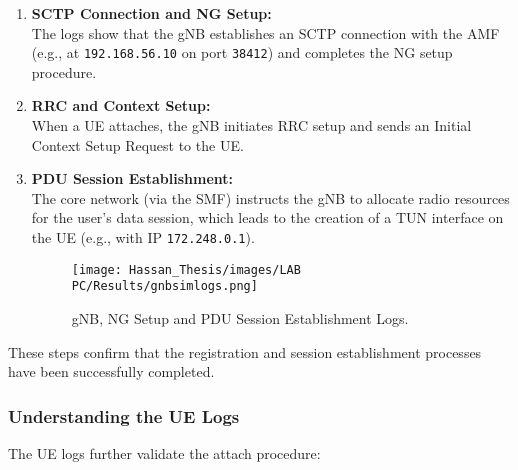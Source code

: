 \begin{enumerate}
    \item \textbf{SCTP Connection and NG Setup:}\\
    The logs show that the gNB establishes an SCTP connection with the AMF 
    (e.g., at \texttt{192.168.56.10} on port \texttt{38412}) and completes 
    the NG setup procedure.

    \item \textbf{RRC and Context Setup:}\\
    When a UE attaches, the gNB initiates RRC setup and sends an Initial Context Setup Request to the UE.

    \item \textbf{PDU Session Establishment:}\\
    The core network (via the SMF) instructs the gNB to allocate radio resources 
    for the user’s data session, which leads to the creation of a TUN interface 
    on the UE (e.g., with IP \texttt{172.248.0.1}).
 
    \begin{figure}[H]
        \centering
          \texttt{[image: Hassan\_Thesis/images/LAB PC/Results/gnbsimlogs.png]}
        \caption{gNB, NG Setup and PDU Session Establishment Logs.}
        \label{fig:gnb-log-screenshot}
    \end{figure}

\end{enumerate}

These steps confirm that the registration and session establishment processes 
have been successfully completed.

\subsubsection{Understanding the UE Logs}
\label{subsec:ue-logs}

The UE logs further validate the attach procedure:

